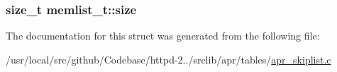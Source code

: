 \subsubsection[{\texorpdfstring{size}{size}}]{\setlength{\rightskip}{0pt plus 5cm}size\+\_\+t memlist\+\_\+t\+::size}\hypertarget{structmemlist__t_a36fa7aec9c4d87cda753c4757bb05214}{}\label{structmemlist__t_a36fa7aec9c4d87cda753c4757bb05214}


The documentation for this struct was generated from the following file\+:\begin{DoxyCompactItemize}
\item 
/usr/local/src/github/\+Codebase/httpd-\/2../srclib/apr/tables/\hyperlink{apr__skiplist_8c}{apr\+\_\+skiplist.\+c}\end{DoxyCompactItemize}
